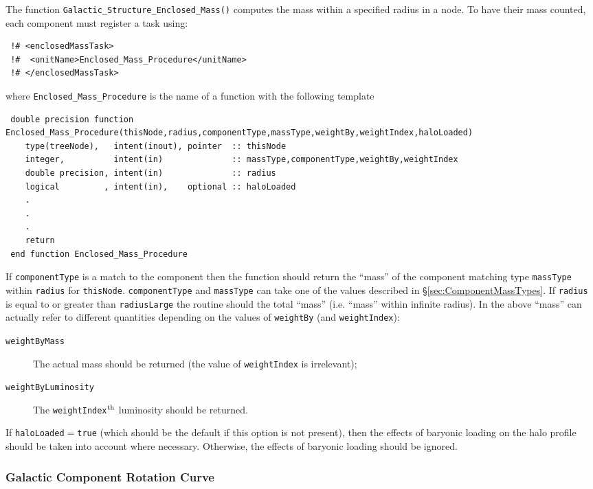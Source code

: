 The function {\tt Galactic\_Structure\_Enclosed\_Mass()} computes the mass within a specified radius in a node. To have their mass counted, each component must register a task using:
\begin{verbatim}
 !# <enclosedMassTask>
 !#  <unitName>Enclosed_Mass_Procedure</unitName>
 !# </enclosedMassTask>
\end{verbatim}
where {\tt Enclosed\_Mass\_Procedure} is the name of a function with the following template
\begin{verbatim}
 double precision function Enclosed_Mass_Procedure(thisNode,radius,componentType,massType,weightBy,weightIndex,haloLoaded)
    type(treeNode),   intent(inout), pointer  :: thisNode
    integer,          intent(in)              :: massType,componentType,weightBy,weightIndex
    double precision, intent(in)              :: radius
    logical         , intent(in),    optional :: haloLoaded
    .
    .
    .
    return
 end function Enclosed_Mass_Procedure
\end{verbatim}
If {\tt componentType} is a match to the component then the function should return the ``mass'' of the component matching type {\tt massType} within {\tt radius} for {\tt thisNode}.  {\tt componentType} and {\tt massType} can take one of the values described in \S\ref{sec:ComponentMassTypes}.
If {\tt radius} is equal to or greater than {\tt radiusLarge} the routine should the total ``mass'' (i.e. ``mass'' within infinite radius). In the above ``mass'' can actually refer to different quantities depending on the values of {\tt weightBy} (and {\tt weightIndex}):
\begin{description}
\item [{\tt weightByMass}] The actual mass should be returned (the value of {\tt weightIndex} is irrelevant);
\item [{\tt weightByLuminosity}] The {\tt weightIndex}$^{\rm th}$ luminosity should be returned.
\end{description}
If {\tt haloLoaded}$=${\tt true} (which should be the default if this option is not present), then the effects of baryonic loading on the halo profile should be taken into account where necessary. Otherwise, the effects of baryonic loading should be ignored.

\subsubsection{Galactic Component Rotation Curve}

